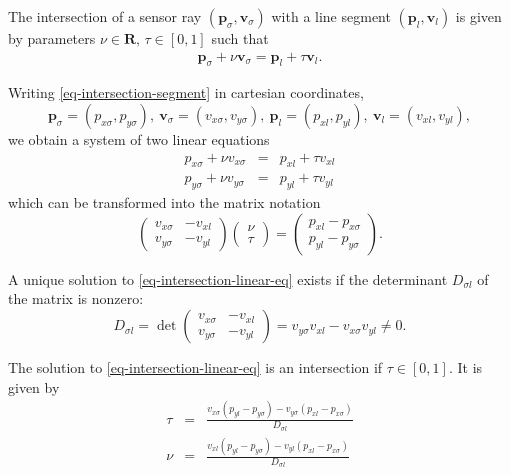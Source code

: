 \documentclass[11pt]{article}
\newcommand{\Dsigl}{D_{\sigma l}}
\newcommand{\pbl}{\mathbf{p}_l}
\newcommand{\pbsig}{\mathbf{p}_\sigma}
\newcommand{\pxl}{p_{xl}}
\newcommand{\pyl}{p_{yl}}
\newcommand{\pxsig}{p_{x\sigma}}
\newcommand{\pysig}{p_{y\sigma}}
\newcommand{\Rb}{\mathbf{R}}
\newcommand{\vbl}{\mathbf{v}_l}
\newcommand{\vxl}{v_{xl}}
\newcommand{\vyl}{v_{yl}}
\newcommand{\vbsig}{\mathbf{v}_\sigma}
\newcommand{\vxsig}{v_{x\sigma}}
\newcommand{\vysig}{v_{y\sigma}}
\begin{document}
The intersection of a sensor ray $(\pbsig,\vbsig)$ with a line segment
$(\pbl,\vbl)$ is given by parameters $\nu\in\Rb,\,\tau\in[0,1]$ such that
\begin{eqnarray}
    \pbsig + \nu \vbsig = \pbl + \tau \vbl. \label{eq-intersection-segment}
\end{eqnarray}

Writing \eqref{eq-intersection-segment} in cartesian coordinates,
\begin{equation}
    \pbsig=(\pxsig, \pysig),\:
    \vbsig=(\vxsig, \vysig),\:
    \pbl=(\pxl, \pyl),\:
    \vbl=(\vxl, \vyl),\label{eq-intersection-cartesian}
\end{equation}
we obtain a system of two linear equations
\begin{eqnarray*}
    \pxsig + \nu \vxsig &=& \pxl + \tau \vxl \\
    \pysig + \nu \vysig &=& \pyl + \tau \vyl
\end{eqnarray*}
which can be transformed into the matrix notation
\begin{equation}
    \left(
        \begin{matrix}
            \vxsig & -\vxl \\ \vysig & -\vyl
        \end{matrix}
    \right)
    \left(
        \begin{matrix}
            \nu \\ \tau
        \end{matrix}
    \right)
    =
    \left(
        \begin{matrix}
            \pxl - \pxsig \\ \pyl - \pysig
        \end{matrix}
    \right).\label{eq-intersection-linear-eq}
\end{equation}

A unique solution to \eqref{eq-intersection-linear-eq} exists if the
determinant $\Dsigl$ of the matrix is nonzero:
\begin{equation}
    \Dsigl=\det\left(
        \begin{matrix}
            \vxsig & -\vxl \\ \vysig & -\vyl
        \end{matrix}
    \right)=
    \vysig\vxl - \vxsig\vyl \neq 0.\label{eq-intersection-determinant}
\end{equation}

The solution to \eqref{eq-intersection-linear-eq} is an intersection if
$\tau\in[0,1]$. It is given by
\begin{eqnarray}
\tau &=& \frac{\vxsig(\pyl - \pysig) - \vysig(\pxl - \pxsig)}{\Dsigl}
    \label{eq-intersection-tau}  \\
\nu &=& \frac{\vxl(\pyl-\pysig)-\vyl(\pxl-\pxsig)}{\Dsigl}
    \label{eq-intersection-nu}
\end{eqnarray}
\end{document}
